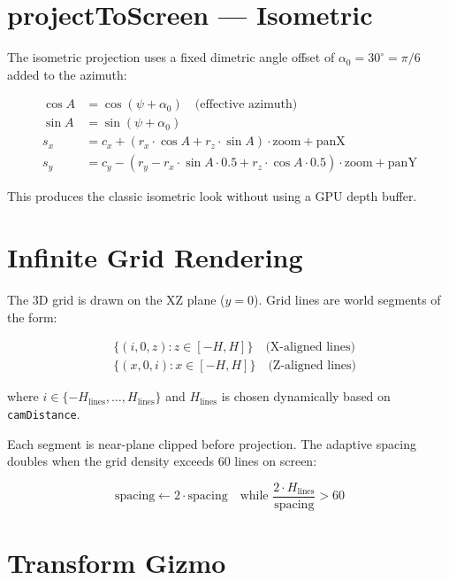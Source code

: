 \section{projectToScreen --- Isometric}

The isometric projection uses a fixed dimetric angle offset of
$\alpha_0 = 30^\circ = \pi/6$ added to the azimuth:

\begin{align}
  \cos A &= \cos(\psi + \alpha_0) \quad\text{(effective azimuth)} \\
  \sin A &= \sin(\psi + \alpha_0) \\
  s_x &= c_x + (r_x \cdot \cos A + r_z \cdot \sin A) \cdot \text{zoom} + \text{panX} \\
  s_y &= c_y - (r_y - r_x \cdot \sin A \cdot 0.5 + r_z \cdot \cos A \cdot 0.5) \cdot \text{zoom} + \text{panY}
\end{align}

This produces the classic isometric look without using a GPU depth buffer.

\section{Infinite Grid Rendering}

The 3D grid is drawn on the XZ plane ($y = 0$). Grid lines are world
segments of the form:

\begin{align}
  &\{(i, 0, z) : z \in [-H, H]\} \quad \text{(X-aligned lines)} \\
  &\{(x, 0, i) : x \in [-H, H]\} \quad \text{(Z-aligned lines)}
\end{align}

where $i \in \{-H_\text{lines}, \ldots, H_\text{lines}\}$ and
$H_\text{lines}$ is chosen dynamically based on \texttt{camDistance}.

Each segment is near-plane clipped before projection. The adaptive
spacing doubles when the grid density exceeds 60 lines on screen:

\begin{equation}
\text{spacing} \leftarrow 2 \cdot \text{spacing}
\quad \text{while } \frac{2 \cdot H_\text{lines}}{\text{spacing}} > 60
\end{equation}

\section{Transform Gizmo}

